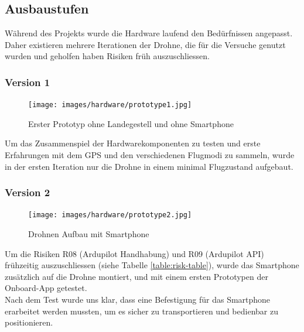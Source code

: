 \subsection{Ausbaustufen}

Während des Projekts wurde die Hardware laufend den Bedürfnissen angepasst. Daher existieren mehrere Iterationen der Drohne, die für die Versuche genutzt wurden und geholfen haben Risiken früh auszuschliessen.

\subsubsection{Version 1}

\begin{figure}[H]
\centering
\texttt{[image: images/hardware/prototype1.jpg]}
\caption{Erster Prototyp ohne Landegestell und ohne Smartphone}
\label{fig:prototyp-1}
\end{figure}

Um das Zusammenspiel der Hardwarekomponenten zu testen und erste Erfahrungen mit dem GPS und den verschiedenen Flugmodi zu sammeln, wurde in der ersten Iteration nur die Drohne in einem minimal Flugzustand aufgebaut.

\subsubsection{Version 2}

\begin{figure}[H]
\centering
\texttt{[image: images/hardware/prototype2.jpg]}
\caption{Drohnen Aufbau mit Smartphone}
\label{fig:prototyp-2}
\end{figure}

Um die Risiken R08 (Ardupilot Handhabung) und R09 (Ardupilot API) frühzeitig auszuschliessen (siehe Tabelle \ref{table:risk-table}), wurde das Smartphone zusätzlich auf die Drohne montiert, und mit einem ersten Prototypen der Onboard-App getestet. \\
Nach dem Test wurde uns klar, dass eine Befestigung für das Smartphone erarbeitet werden mussten, um es sicher zu transportieren und bedienbar zu positionieren.


